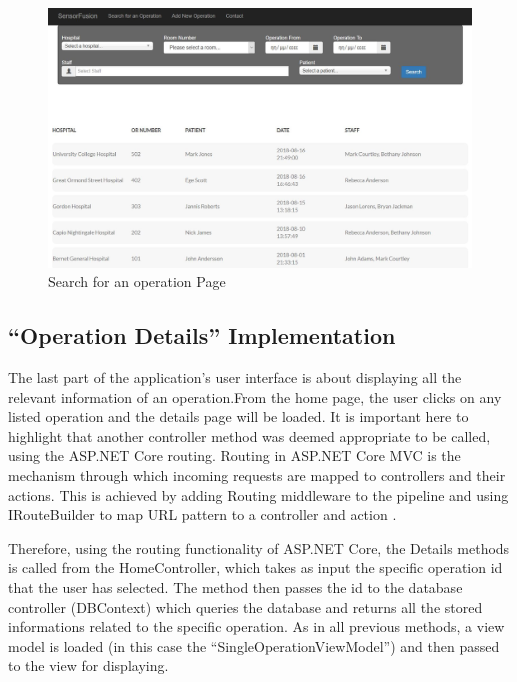 \begin{figure}[!ht]
\begin{center}
\includegraphics[width=17cm]{imgs/search_operation_page.jpg}
\end{center}\vspace{-0.3cm}
\caption[Search for an operation Page]{Search for an operation Page} \label{search_operation_page}
\end{figure}

\subsection{``Operation Details'' Implementation}
\label{sub:operation_details_implentation}

The last part of the application's user interface is about displaying all the relevant information of an operation.From the home page, the user clicks on any listed operation and the details page will be loaded. It is important here to highlight that another controller method was deemed appropriate to be called, using the ASP.NET Core routing. Routing in ASP.NET Core MVC is the mechanism through which incoming requests are mapped to controllers and their actions. This is achieved by adding Routing middleware to the pipeline and using IRouteBuilder to map URL pattern to a controller and action \cite{routing}.

Therefore, using the routing functionality of ASP.NET Core, the Details methods is called from the HomeController, which takes as input the specific operation id that the user has selected. The method then passes the id to the database controller (DBContext) which queries the database and returns all the stored informations related to the specific operation. As in all previous methods, a view model is loaded (in this case the ``SingleOperationViewModel'') and then passed to the view for displaying.



